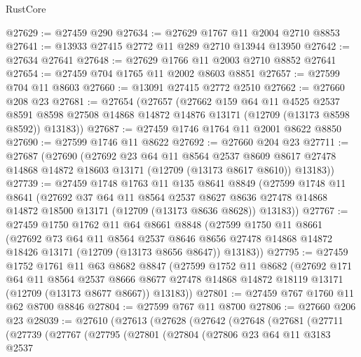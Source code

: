 \begin{lexlean}{RustCore}
\begin{coremodule}
@27629 := @27459 @290
@27634 := @27629 @1767 @11 @2004 @2710 @8853
@27641 := @13933 @27415 @2772 @11 @289 @2710 @13944 @13950
@27642 := @27634 @27641
@27648 := @27629 @1766 @11 @2003 @2710 @8852 @27641
@27654 := @27459 @704 @1765 @11 @2002 @8603 @8851
@27657 := @27599 @704 @11 @8603
@27660 := @13091 @27415 @2772 @2510
@27662 := @27660 @208 @23
@27681 := @27654
    (@27657
      (@27662
        @159
        @64
        @11
        @4525
        @2537
        @8591
        @8598
        @27508
        @14868
        @14872
        @14876
        @13171
        (@12709 (@13173 @8598 @8592))
        @13183))
@27687 := @27459 @1746 @1764 @11 @2001 @8622 @8850
@27690 := @27599 @1746 @11 @8622
@27692 := @27660 @204 @23
@27711 := @27687
    (@27690
      (@27692
        @23
        @64
        @11
        @8564
        @2537
        @8609
        @8617
        @27478
        @14868
        @14872
        @18603
        @13171
        (@12709 (@13173 @8617 @8610))
        @13183))
@27739 := @27459
    @1748
    @1763
    @11
    @135
    @8641
    @8849
    (@27599
      @1748
      @11
      @8641
      (@27692
        @37
        @64
        @11
        @8564
        @2537
        @8627
        @8636
        @27478
        @14868
        @14872
        @18500
        @13171
        (@12709 (@13173 @8636 @8628))
        @13183))
@27767 := @27459
    @1750
    @1762
    @11
    @64
    @8661
    @8848
    (@27599
      @1750
      @11
      @8661
      (@27692
        @73
        @64
        @11
        @8564
        @2537
        @8646
        @8656
        @27478
        @14868
        @14872
        @18426
        @13171
        (@12709 (@13173 @8656 @8647))
        @13183))
@27795 := @27459
    @1752
    @1761
    @11
    @63
    @8682
    @8847
    (@27599
      @1752
      @11
      @8682
      (@27692
        @171
        @64
        @11
        @8564
        @2537
        @8666
        @8677
        @27478
        @14868
        @14872
        @18119
        @13171
        (@12709 (@13173 @8677 @8667))
        @13183))
@27801 := @27459 @767 @1760 @11 @62 @8700 @8846
@27804 := @27599 @767 @11 @8700
@27806 := @27660 @206 @23
@28039 := @27610
    (@27613
      (@27628
        (@27642
          (@27648
            (@27681
              (@27711
                (@27739
                  (@27767
                    (@27795
                      (@27801
                        (@27804
                          (@27806
                            @23
                            @64
                            @11
                            @3183
                            @2537

\end{coremodule}
\end{lexlean}
